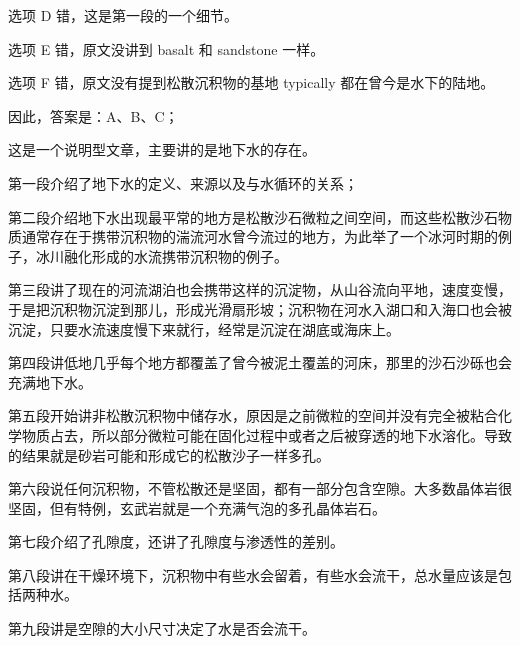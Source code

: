 \begin{blk}
\begin{nlz}
        选项 D 错，这是第一段的一个细节。

        选项 E 错，原文没讲到 basalt 和 sandstone 一样。

        选项 F 错，原文没有提到松散沉积物的基地 typically 都在曾今是水下的陆地。

        因此，答案是：A、B、C；

        这是一个说明型文章，主要讲的是地下水的存在。

        第一段介绍了地下水的定义、来源以及与水循环的关系；

        第二段介绍地下水出现最平常的地方是松散沙石微粒之间空间，而这些松散沙石物质通常存在于携带沉积物的湍流河水曾今流过的地方，为此举了一个冰河时期的例子，冰川融化形成的水流携带沉积物的例子。

        第三段讲了现在的河流湖泊也会携带这样的沉淀物，从山谷流向平地，速度变慢，于是把沉积物沉淀到那儿，形成光滑扇形坡；沉积物在河水入湖口和入海口也会被沉淀，只要水流速度慢下来就行，经常是沉淀在湖底或海床上。

        第四段讲低地几乎每个地方都覆盖了曾今被泥土覆盖的河床，那里的沙石沙砾也会充满地下水。

        第五段开始讲非松散沉积物中储存水，原因是之前微粒的空间并没有完全被粘合化学物质占去，所以部分微粒可能在固化过程中或者之后被穿透的地下水溶化。导致的结果就是砂岩可能和形成它的松散沙子一样多孔。

        第六段说任何沉积物，不管松散还是坚固，都有一部分包含空隙。大多数晶体岩很坚固，但有特例，玄武岩就是一个充满气泡的多孔晶体岩石。

        第七段介绍了孔隙度，还讲了孔隙度与渗透性的差别。

        第八段讲在干燥环境下，沉积物中有些水会留着，有些水会流干，总水量应该是包括两种水。

        第九段讲是空隙的大小尺寸决定了水是否会流干。
    \end{nlz}
\end{blk}
